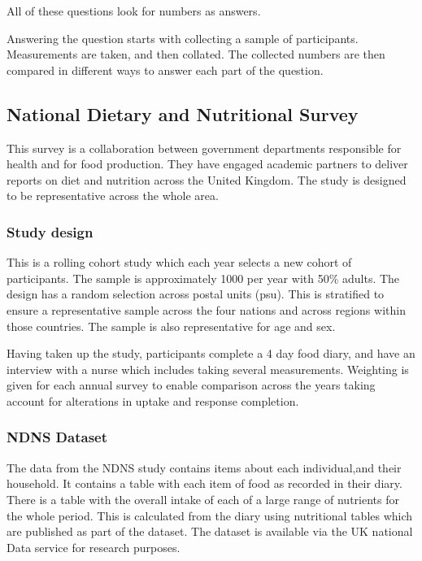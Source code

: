 \documentclass[
]{article}
\begin{document}
All of these questions look for numbers as answers.

Answering the question starts with collecting a sample of participants.
Measurements are taken, and then collated. The collected numbers are
then compared in different ways to answer each part of the question.

\hypertarget{national-dietary-and-nutritional-survey}{%
\subsection{National Dietary and Nutritional
Survey}\label{national-dietary-and-nutritional-survey}}

This survey is a collaboration between government departments
responsible for health and for food production. They have engaged
academic partners to deliver reports on diet and nutrition across the
United Kingdom. The study is designed to be representative across the
whole area.

\hypertarget{study-design}{%
\subsubsection{Study design}\label{study-design}}

This is a rolling cohort study which each year selects a new cohort of
participants. The sample is approximately 1000 per year with 50\%
adults. The design has a random selection across postal units (psu).
This is stratified to ensure a representative sample across the four
nations and across regions within those countries. The sample is also
representative for age and sex.

Having taken up the study, participants complete a 4 day food diary, and
have an interview with a nurse which includes taking several
measurements. Weighting is given for each annual survey to enable
comparison across the years taking account for alterations in uptake and
response completion.

\hypertarget{ndns-dataset}{%
\subsubsection{NDNS Dataset}\label{ndns-dataset}}

The data from the NDNS study contains items about each individual,and
their household. It contains a table with each item of food as recorded
in their diary. There is a table with the overall intake of each of a
large range of nutrients for the whole period. This is calculated from
the diary using nutritional tables which are published as part of the
dataset. The dataset is available via the UK national Data service for
research purposes.
\end{document}

